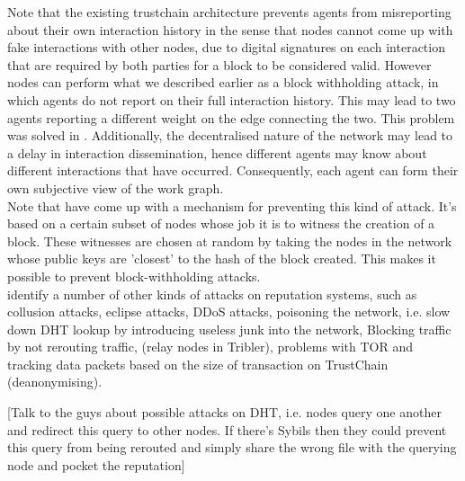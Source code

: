 \documentclass[11pt,a4paper]{article}
\theoremstyle{definition}
\theoremstyle{theorem}
\theoremstyle{proposition}
\theoremstyle{corollary}
\theoremstyle{lemma}
\theoremstyle{example}
\theoremstyle{remark}
\begin{document}
\noindent{}Note that the existing trustchain architecture prevents agents from misreporting about their own interaction history in the sense that nodes cannot come up with fake interactions with other nodes, due to digital signatures on each interaction that are required by both parties for a block to be considered valid. However nodes can perform what we described earlier as a block withholding attack, in which agents do not report on their full interaction history. This may lead to two agents reporting a different weight on the edge connecting the two. This problem was solved in \cite{Jetse's work}. Additionally, the decentralised nature of the network may lead to a delay in interaction dissemination, hence different agents may know about different interactions that have occurred. Consequently, each agent can form their own subjective view of the work graph. \vspace{1em}\\

\noindent{}Note that \cite{Jetse's work} have come up with a mechanism for preventing this kind of attack. It's based on a certain subset of nodes whose job it is to witness the creation of a block. These witnesses are chosen at random by taking the nodes in the network whose public keys are 'closest' to the hash of the block created. This makes it possible to prevent block-withholding attacks. \vspace{1em}\\

\noindent{}\cite{A Survey of Peer-to-Peer Network Security Issues} identify a number of other kinds of attacks on reputation systems, such as collusion attacks, eclipse attacks, DDoS attacks, poisoning the network, i.e. slow down DHT lookup by introducing useless junk into the network, Blocking traffic by not rerouting traffic, (relay nodes in Tribler), problems with TOR and tracking data packets based on the size of transaction on TrustChain (deanonymising). \vspace{1em}\\

\noindent{}\begin{center} [Talk to the guys about possible attacks on DHT, i.e. nodes query one another and redirect this query to other nodes. If there's Sybils then they could prevent this query from being rerouted and simply share the wrong file with the querying node and pocket the reputation] \vspace{1em}\\ \end{center} 
\end{document}
